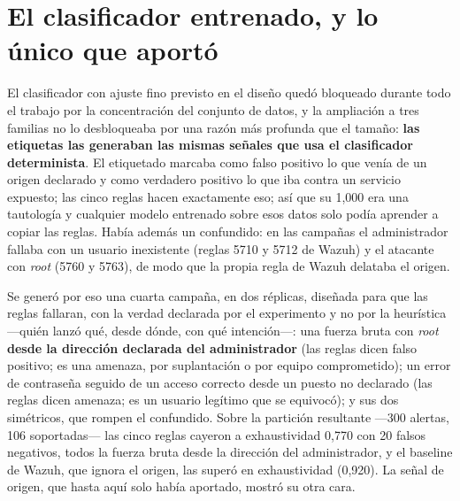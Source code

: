 \section{El clasificador entrenado, y lo único que aportó}
\label{sec:entrenado}

El clasificador con ajuste fino previsto en el diseño quedó bloqueado durante todo el trabajo por
la concentración del conjunto de datos, y la ampliación a tres familias no lo desbloqueaba por una
razón más profunda que el tamaño: \textbf{las etiquetas las generaban las mismas señales que usa
el clasificador determinista}. El etiquetado marcaba como falso positivo lo que venía de un origen
declarado y como verdadero positivo lo que iba contra un servicio expuesto; las cinco reglas
hacen exactamente eso; así que su 1,000 era una tautología y cualquier modelo entrenado sobre
esos datos solo podía aprender a copiar las reglas. Había además un confundido: en las campañas
el administrador fallaba con un usuario inexistente (reglas 5710 y 5712 de Wazuh) y el atacante
con \emph{root} (5760 y 5763), de modo que la propia regla de Wazuh delataba el origen.

Se generó por eso una cuarta campaña, en dos réplicas, diseñada para que las reglas fallaran, con
la verdad declarada por el experimento y no por la heurística ---quién lanzó qué, desde dónde,
con qué intención---: una fuerza bruta con \emph{root} \textbf{desde la dirección declarada del
administrador} (las reglas dicen falso positivo; es una amenaza, por suplantación o por equipo
comprometido); un error de contraseña seguido de un acceso correcto desde un puesto no declarado
(las reglas dicen amenaza; es un usuario legítimo que se equivocó); y sus dos simétricos, que
rompen el confundido. Sobre la partición resultante ---300 alertas, 106 soportadas--- las cinco
reglas cayeron a exhaustividad 0,770 con 20 falsos negativos, todos la fuerza bruta desde la
dirección del administrador, y el baseline de Wazuh, que ignora el origen, las superó en
exhaustividad (0,920). La señal de origen, que hasta aquí solo había aportado, mostró su otra cara.

